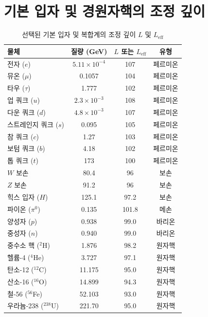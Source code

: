 \documentclass[12pt,a4paper]{article}
\begin{document}
	\section*{기본 입자 및 경원자핵의 조정 깊이}
	\begin{table}[H]
		\centering
		\caption{선택된 기본 입자 및 복합계의 조정 깊이 \(L\) 및 \(L_{\mathrm{eff}}\)}
		\label{tab:depths_particles}
		\small
		\begin{tabular}{l c c c}
			\toprule
			\textbf{물체} & \textbf{질량 (GeV)} & \textbf{\(L\) 또는 \(L_{\mathrm{eff}}\)} & \textbf{유형} \\
			\midrule
			전자 (\(e\)) & \(5.11\times10^{-4}\) & 107 & 페르미온 \\
			뮤온 (\(\mu\)) & 0.1057 & 104 & 페르미온 \\
			타우 (\(\tau\)) & 1.777 & 102 & 페르미온 \\
			업 쿼크 (\(u\)) & \(2.3\times10^{-3}\) & 108 & 페르미온 \\
			다운 쿼크 (\(d\)) & \(4.8\times10^{-3}\) & 107 & 페르미온 \\
			스트레인지 쿼크 (\(s\)) & 0.095 & 105 & 페르미온 \\
			참 쿼크 (\(c\)) & 1.27 & 103 & 페르미온 \\
			보텀 쿼크 (\(b\)) & 4.18 & 102 & 페르미온 \\
			톱 쿼크 (\(t\)) & 173 & 100 & 페르미온 \\
			\(W\) 보손 & 80.4 & 96 & 보손 \\
			\(Z\) 보손 & 91.2 & 96 & 보손 \\
			힉스 입자 (\(H\)) & 125.1 & 97.2 & 보손 \\
			파이온 (\(\pi^0\)) & 0.135 & 101.8 & 메손 \\
			양성자 (\(p\)) & 0.938 & 99.0 & 바리온 \\
			중성자 (\(n\)) & 0.940 & 99.0 & 바리온 \\
			중수소 핵 (\(^2\)H) & 1.876 & 98.2 & 원자핵 \\
			헬륨-4 (\(^4\)He) & 3.727 & 97.1 & 원자핵 \\
			탄소-12 (\(^{12}\)C) & 11.175 & 95.0 & 원자핵 \\
			산소-16 (\(^{16}\)O) & 14.899 & 94.3 & 원자핵 \\
			철-56 (\(^{56}\)Fe) & 52.103 & 93.0 & 원자핵 \\
			우라늄-238 (\(^{238}\)U) & 221.70 & 95.0 & 원자핵 \\
			\bottomrule
		\end{tabular}
	\end{table}
	
\end{document}
